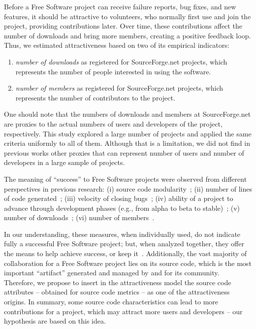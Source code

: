 \documentclass[conference]{IEEEtran}
\begin{document}
%
Before a Free Software project can receive failure reports, bug fixes, 
and new features, it should be attractive to volunteers, who normally first
use and join the project, providing contributions later.
%
Over time, these contributions affect the number of downloads and bring more 
members, creating a positive feedback loop.
%
Thus, we estimated attractiveness based on two of its empirical indicators:
\begin{enumerate}
\item \emph{number of downloads} as registered for SourceForge.net projects, which
represents the number of people interested in using the software.
\item \emph{number of members} as registered for SourceForge.net projects, which
represents the number of contributors to the project.
\end{enumerate}


One should note that the numbers of downloads and members at SourceForge.net
are proxies to the actual numbers of users and developers of the project, respectively.
%
This study explored a large number of projects and applied the same criteria
uniformly to all of them. 
%
Although that is a limitation, we did not find in previous works other proxies
that can represent number of users and number of developers in a large sample of projects.

The meaning of ``success'' to Free Software projects were
observed from different perspectives in previous research:
%
(i) source code modularity~\cite{shaikh2003};
(ii) number of lines of code generated~\cite{mockus2000};
(iii) velocity of closing bugs~\cite{Stewart2006};
(iv) ability of a project to advance through development phases
(e.g., from alpha to beta to stable)~\cite{raja2006,Crowston2002};
(v) number of downloads~\cite{balijepally2009};
(vi) number of members~\cite{crowston2006}.

In our understanding, these measures, when individually used, do not indicate
fully a successful Free Software project; but, when analyzed together, they
offer the means to help achieve success, or keep it~\cite{Santos2010}.
%
Additionally, the vast majority of collaboration for a Free Software project
lies on its source code, which is the most important ``artifact'' generated and
managed by and for its community.
%
Therefore, we propose to insert in the attractiveness model the source code
attributes -- obtained for source code metrics -- as one of the attractiveness origins.
%
In summary, some source code characteristics can lead to more contributions for
a project, which may attract more users and developers -- our hypothesis are based
on this idea.
\end{document}
